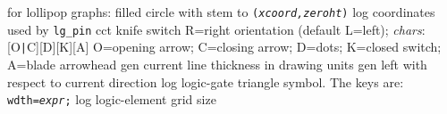   {for lollipop graphs: filled circle with stem to
    {\tt ({\sl xcoord,zeroht})}}%
%
  {log}%
  {coordinates used by {\tt lg\_pin}}%
%
  {cct}%
  {knife switch R=right orientation (default L=left);
    {\sl chars}: [O{\tt|}C][D][K][A] O=opening arrow; C=closing arrow;
    D=dots; K=closed switch; A=blade arrowhead }%
%
  {gen}%
  {current line thickness in drawing units}%
%
  {gen}%
  {left with respect to current direction}%
%
  {log}%
  {logic-gate triangle symbol. The keys are:
    {\tt wdth={\sl expr};}}%
%
  {log}%
  {logic-element grid size}%

%

